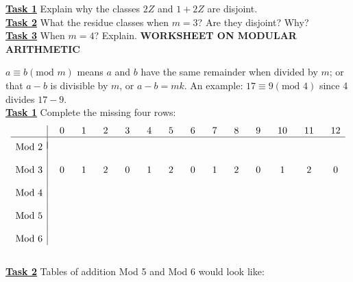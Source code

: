\documentclass[12pt, fleqn, oneside]{book}
\begin{document}
\underline{\bf{Task 1}} Explain why the classes $2Z$ and $1+2Z$ are disjoint.\\[2in]
\underline{\bf{Task 2}} What the residue classes when $m=3$?  Are they disjoint?  Why?\\[1.5in]
\underline{\bf{Task 3}}  When $m=4$?  Explain.
%
%
%
\clearpage%
%
%
%
{\large \bf WORKSHEET ON MODULAR ARITHMETIC}\\[.25in]
$a\equiv b(\text{mod }m)$ means $a$ and $b$ have the same remainder when divided by $m$; or that $a-b$ is divisible by $m$, or $a-b=mk$.  An example: $17\equiv 9(\text{mod } 4)$ since 4 divides $17-9$.\\[.25in]
\underline{\bf{Task 1}} Complete the missing four rows:
$$\begin{array}{c|ccccccccccccc}
&\phantom{-}0&\phantom{-}1&\phantom{-}2&\phantom{-}3&\phantom{-}4&\phantom{-}5&\phantom{-}6&\phantom{-}7&\phantom{-}8&\phantom{-}9&\phantom{-}10&\phantom{-}11&\phantom{-}12\\
\hline\\[-.1in]
\text{Mod } 2&&&&&&&&&&&&&\\
\\
\text{Mod } 3&\phantom{-}0&\phantom{-}1&\phantom{-}2&\phantom{-}0&\phantom{-}1&\phantom{-}2&\phantom{-}0&\phantom{-}1&\phantom{-}2&\phantom{-}0&\phantom{-}1&\phantom{-}2&\phantom{-}0\\
\\
\text{Mod } 4&\\
\\
\text{Mod } 5&\\
\\
\text{Mod } 6&
\end{array}$$\\[1.5in]
\underline{\bf{Task 2}} Tables of addition Mod 5 and Mod 6 would look like:\\[.2in]
\end{document}
